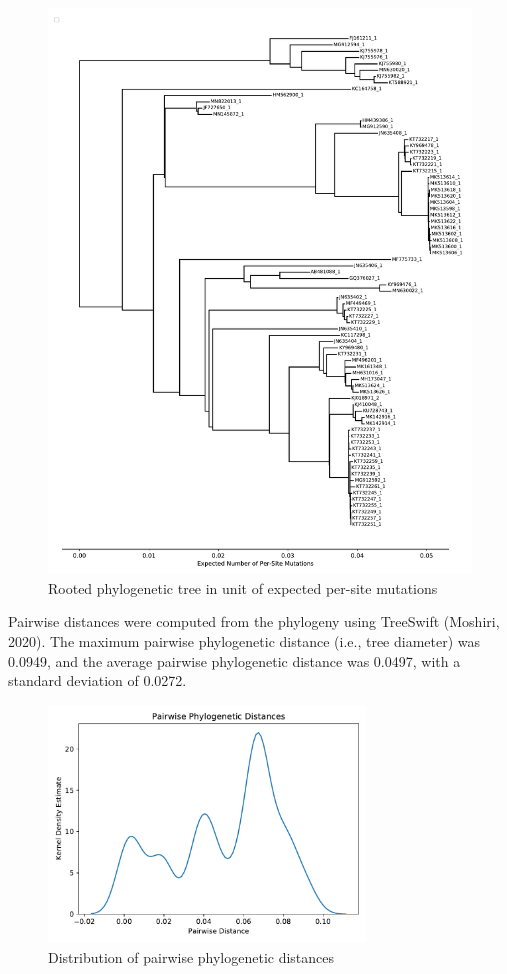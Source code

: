\documentclass{article}
\begin{document}
\begin{figure}[h]
\centering
\includegraphics[width=1\textwidth,height=1\textheight,keepaspectratio]{./figs/tree_mutations.pdf}
\caption{Rooted phylogenetic tree in unit of expected per-site mutations}
\end{figure}

Pairwise distances were computed from the phylogeny using TreeSwift (Moshiri, 2020). The maximum pairwise phylogenetic distance (i.e., tree diameter) was 0.0949, and the average pairwise phylogenetic distance was 0.0497, with a standard deviation of 0.0272.

\begin{figure}[h]
\centering
\includegraphics[width=0.75\textwidth,keepaspectratio]{./figs/pairwise_distances_tree.pdf}
\caption{Distribution of pairwise phylogenetic distances}
\end{figure}
\end{document}

